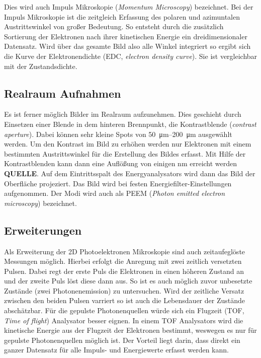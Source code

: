             Dies wird auch Impuls Mikroskopie (\textit{Momentum Microscopy}) bezeichnet.
            Bei der Impuls Mikroskopie ist die zeitgleich Erfassung des polaren und azimuntalen Austrittswinkel von großer Bedeutung. 
            So entsteht durch die zusätzlich Sortierung der Elektronen nach ihrer kinetischen Energie ein dreidimensionaler Datensatz.
            Wird über das gesamte Bild also alle Winkel integriert so ergibt sich die Kurve der Elektronendichte (EDC, \textit{electron density curve}).
            Sie ist vergleichbar mit der Zustandsdichte.

        \subsection{Realraum Aufnahmen}
            Es ist ferner möglich Bilder im Realraum aufzunehmen.
            Dies geschieht durch Einsetzen einer Blende in dem hinteren Brennpunkt, die Kontrastblende (\textit{contrast aperture}).
            Dabei können sehr kleine Spots von \SIrange{50}{200}{\micro\meter} ausgewählt werden.
            Um den Kontrast im Bild zu erhöhen werden nur Elektronen mit einem bestimmten Austrittswinkel für die Erstellung des Bildes erfasst.
            Mit Hilfe der Kontrastblenden kann dann eine Auflößung von einigen \si{\nano\meter} erreicht werden \textbf{QUELLE}. 
            Auf dem Eintrittsspalt des Energyanalysators wird dann das Bild der Oberfläche projeziert.
            Das Bild wird bei festen Energiefilter-Einstellungen aufgenommen.
            Der Modi wird auch als PEEM (\textit{Photon emitted electron microscopy}) bezeichnet.

        \subsection{Erweiterungen}
            Als Erweiterung der 2D Photoelektronen Mikroskopie sind auch zeitaufeglöste Messungen möglich.
            Hierbei erfolgt die Anregung mit zwei zeitlich versetzten Pulsen. 
            Dabei regt der erste Puls die Elektronen in einen höheren Zustand an und der zweite Puls löst diese dann aus.
            So ist es auch möglich zuvor unbesetzte Zustände (zwei Photonenemission) zu untersuchen.
            Wird der zeitliche Versatz zwischen den beiden Pulsen varriert so ist auch die Lebensdauer der Zustände abschätzbar.
            Für die gepulste Photonenquellen würde sich ein Flugzeit (TOF, \textit{Time of flight}) Analysator besser eignen.
            In einem TOF Analysators wird die kinetische Energie aus der Flugzeit der Elektronen bestimmt, weswegen es nur für gepulste Photonenquellen möglich ist.
            Der Vorteil liegt darin, dass direkt ein ganzer Datensatz für alle Impuls- und Energiewerte erfasst werden kann.

